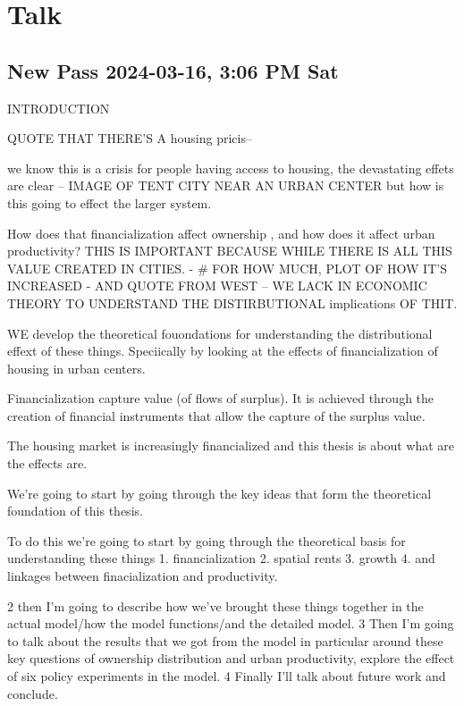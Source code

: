 \chapter{Talk}

\section{New Pass 2024-03-16, 3:06 PM Sat}

INTRODUCTION

QUOTE THAT THERE'S A housing pricis--

we know this is a crisis for people having access to housing, the devastating effets are clear -- IMAGE OF TENT CITY NEAR AN URBAN CENTER
but how is this going to effect the larger system.


How does that financialization affect ownership , and how does it affect urban productivity?
THIS IS IMPORTANT BECAUSE WHILE THERE IS ALL THIS VALUE CREATED IN CITIES. - # FOR HOW MUCH, PLOT OF HOW IT'S INCREASED - AND QUOTE FROM WEST -- WE LACK IN ECONOMIC THEORY TO UNDERSTAND THE DISTIRBUTIONAL implications OF THIT.


WE develop the theoretical fouondations for understanding the distributional effext of these things. Speciically by looking at the effects of financialization of housing in urban centers. 

Financialization capture value (of flows of surplus). It is achieved through the creation of financial instruments that allow the capture of the surplus value. 

The housing market is increasingly financialized and this thesis is about what are the effects are. 

We’re going to start by going through the key ideas that form the theoretical foundation of this thesis.


To do this we’re going to start by going through the theoretical basis for understanding these things
1. financialization
2. spatial rents
3. growth
4. and linkages between finacialization and productivity.
 
 2 then I'm going to describe how we've brought these things together in the actual model/how the model functions/and the detailed model.
 3 Then I'm going to talk about the results that we got from the model in particular around these key questions of ownership distribution and urban productivity, explore the effect of six policy experiments in the model. 
 4 Finally I'll talk about future work and conclude.



